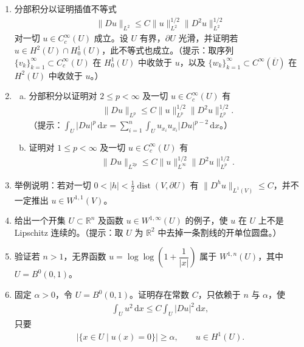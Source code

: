 \documentclass[../../main.tex]{subfiles}
\begin{document}
\begin{enumerate}
\item 分部积分以证明插值不等式
\begin{align*}
\|Du\|_{L^{2}}\leqslant C\|u\|_{L^{2}}^{1/2}\|D^{2}u\|_{L^{2}}^{1/2}
\end{align*}
对一切 $u\in C^{\infty}_{c}(U)$ 成立。设 $U$ 有界，$\partial U$ 光滑，并证明若 $u\in H^{2}(U)\cap H^{1}_{0}(U)$，此不等式也成立。（提示：取序列 $\{v_{k}\}_{k=1}^{\infty}\subset C^{\infty}_{c}(U)$ 在 $H^{1}_{0}(U)$ 中收敛于 $u$，以及 $\{w_{k}\}_{k=1}^{\infty}\subset C^{\infty}(\overline{U})$ 在 $H^{2}(U)$ 中收敛于 $u$。）

\item \leavevmode
\begin{enumerate}[(a)]
\item 分部积分以证明对 $2\leqslant p<\infty$ 及一切 $u\in C^{\infty}_{c}(U)$ 有
\begin{align*}
\|Du\|_{L^{p}}\leqslant C\|u\|_{L^{p}}^{1/2}\|D^{2}u\|_{L^{p}}^{1/2}.
\end{align*}
（提示：$\int_{U}|Du|^{p}\,\mathrm{d}x=\sum_{i=1}^{n}\int_{U}u_{x_{i}}u_{x_{i}}|Du|^{p-2}\,\mathrm{d}x$。）
\item 证明对 $1\leqslant p<\infty$ 及一切 $u\in C^{\infty}_{c}(U)$ 有
\begin{align*}
\|Du\|_{L^{2p}}\leqslant C\|u\|_{L^{\infty}}^{1/2}\|D^{2}u\|_{L^{p}}^{1/2}.
\end{align*}
\end{enumerate}

\item 举例说明：若对一切 $0<|h|<\frac{1}{2}\operatorname{dist}(V,\partial U)$ 有 $\|D^{h}u\|_{L^{1}(V)}\leqslant C$，并不一定推出 $u\in W^{1,1}(V)$。

\item 给出一个开集 $U\subset\mathbb{R}^{n}$ 及函数 $u\in W^{1,\infty}(U)$ 的例子，使 $u$ 在 $U$ 上不是 Lipschitz 连续的。（提示：取 $U$ 为 $\mathbb{R}^{2}$ 中去掉一条割线的开单位圆盘。）

\item\label{exercise:ch05-18} 验证若 $n>1$，无界函数 $u=\log\log\left(1+\dfrac{1}{|x|}\right)$ 属于 $W^{1,n}(U)$，其中 $U=B^{0}(0,1)$。

\item 固定 $\alpha>0$，令 $U=B^{0}(0,1)$。证明存在常数 $C$，只依赖于 $n$ 与 $\alpha$，使
\begin{align*}
\int_{U}u^{2}\,\mathrm{d}x\leqslant C\int_{U}|Du|^{2}\,\mathrm{d}x,
\end{align*}
只要
\begin{align*}
|\{x\in U\mid u(x)=0\}|\geqslant\alpha,\qquad u\in H^{1}(U).
\end{align*}


\end{enumerate}
\end{document}
